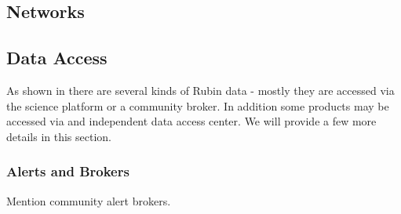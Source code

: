 \subsection{Networks} \label{sec:network}

\subsection{Data Access} \label{sec:dataaccess}

As shown in  there are several kinds of Rubin data - mostly they are accessed via
the science platform or a community broker.
In addition some products may be accessed via and independent data access center. We will provide a few more details in this section.


\subsubsection{Alerts and Brokers}
Mention community alert brokers.
